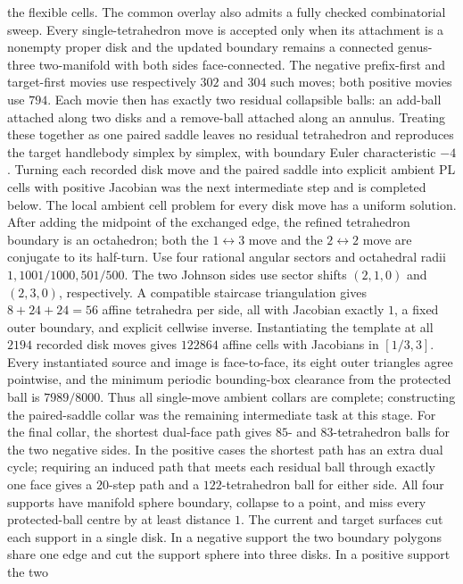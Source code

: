 \documentclass[11pt]{amsart}
\theoremstyle{definition}
\theoremstyle{remark}
\begin{document}
the flexible cells.
The common overlay also admits a fully checked combinatorial sweep.  Every
single-tetrahedron move is accepted only when its attachment is a nonempty
proper disk and the updated boundary remains a connected genus-three
two-manifold with both sides face-connected.  The negative prefix-first and
target-first movies use respectively $302$ and $304$ such moves; both positive
movies use $794$.  Each movie then has exactly two residual collapsible balls:
an add-ball attached along two disks and a remove-ball attached along an
annulus.  Treating these together as one paired saddle leaves no residual
tetrahedron and reproduces the target handlebody simplex by simplex, with
boundary Euler characteristic $-4$.  Turning each recorded disk move and the
paired saddle into explicit ambient PL cells with positive Jacobian was the
next intermediate step and is completed below.
The local ambient cell problem for every disk move has a uniform solution.
After adding the midpoint of the exchanged edge, the refined tetrahedron
boundary is an octahedron; both the $1\leftrightarrow3$ move and the
$2\leftrightarrow2$ move are conjugate to its half-turn.  Use four rational
angular sectors and octahedral radii $1,1001/1000,501/500$.  The two Johnson
sides use sector shifts $(2,1,0)$ and $(2,3,0)$, respectively.  A compatible
staircase triangulation gives $8+24+24=56$ affine tetrahedra per side, all
with Jacobian exactly $1$, a fixed outer boundary, and explicit cellwise
inverse.  Instantiating the template at all $2194$ recorded disk moves gives
$122864$ affine cells with Jacobians in $[1/3,3]$.  Every instantiated source
and image is face-to-face, its eight outer triangles agree pointwise, and the
minimum periodic bounding-box clearance from the protected ball is
$7989/8000$.  Thus all single-move ambient collars are complete; constructing
the paired-saddle collar was the remaining intermediate task at this stage.
For the final collar, the shortest dual-face path gives $85$- and
$83$-tetrahedron balls for the two negative sides.  In the positive cases the
shortest path has an extra dual cycle; requiring an induced path that meets
each residual ball through exactly one face gives a $20$-step path and a
$122$-tetrahedron ball for either side.  All four supports have manifold sphere
boundary, collapse to a point, and miss every protected-ball centre by at
least distance $1$.  The current and target surfaces cut each support in a
single disk.  In a negative support the two boundary polygons share one edge
and cut the support sphere into three disks.  In a positive support the two
\end{document}
